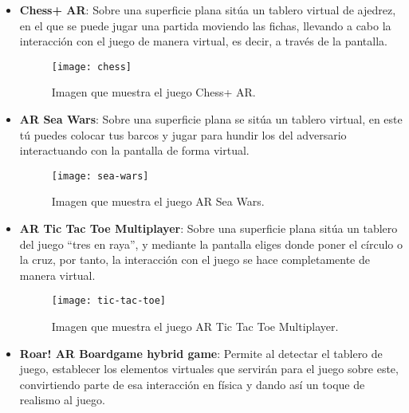 \begin{itemize}
  \item \textbf{Chess+ AR}: Sobre una superficie plana sitúa un tablero virtual de ajedrez, en el que se puede jugar una partida moviendo las fichas, llevando a cabo la interacción con el juego de manera virtual, es decir, a través de la pantalla.

  \begin{figure}[h]
    \centering
    \texttt{[image: chess]}
    \caption{Imagen que muestra el juego Chess+ AR.\protect\footnotemark}
    \label{figura-chess}
  \end{figure}



  \item \textbf{AR Sea Wars}: Sobre una superficie plana se sitúa un tablero virtual, en este tú puedes colocar tus barcos y jugar para hundir los del adversario interactuando con la pantalla de forma virtual.

  \begin{figure}[h]
    \centering
    \texttt{[image: sea-wars]}
    \caption{Imagen que muestra el juego AR Sea Wars.\protect\footnotemark}
    \label{figura-sea-wars}
  \end{figure}


\newpage

  \item \textbf{AR Tic Tac Toe Multiplayer}: Sobre una superficie plana sitúa un tablero del juego “tres en raya”, y mediante la pantalla eliges donde poner el círculo o la cruz, por tanto, la interacción con el juego se hace completamente de manera virtual.

  \begin{figure}[h]
    \centering
    \texttt{[image: tic-tac-toe]}
    \caption{Imagen que muestra el juego AR Tic Tac Toe Multiplayer.\protect\footnotemark}
    \label{figura-tic-tac-toe}
  \end{figure}


  \newpage

  \item \textbf{Roar! AR Boardgame hybrid game}: Permite al detectar el tablero de juego, establecer los elementos virtuales que servirán para el juego sobre este, convirtiendo parte de esa interacción en física y dando así un toque de realismo al juego.


\end{itemize}

